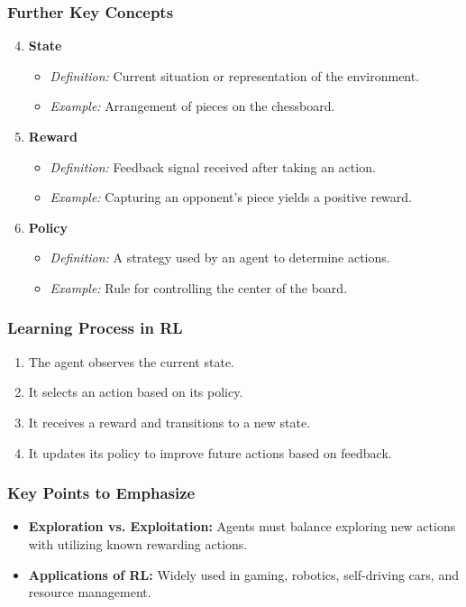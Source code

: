\documentclass[aspectratio=169]{beamer}
\begin{document}
\begin{frame}[fragile]
    \frametitle{Further Key Concepts}
    \begin{enumerate}
        \setcounter{enumi}{3}
        \item \textbf{State}
            \begin{itemize}
                \item \textit{Definition:} Current situation or representation of the environment.
                \item \textit{Example:} Arrangement of pieces on the chessboard.
            \end{itemize}
        
        \item \textbf{Reward}
            \begin{itemize}
                \item \textit{Definition:} Feedback signal received after taking an action.
                \item \textit{Example:} Capturing an opponent's piece yields a positive reward.
            \end{itemize}
        
        \item \textbf{Policy}
            \begin{itemize}
                \item \textit{Definition:} A strategy used by an agent to determine actions.
                \item \textit{Example:} Rule for controlling the center of the board.
            \end{itemize}
    \end{enumerate}
\end{frame}

\begin{frame}[fragile]
    \frametitle{Learning Process in RL}
    \begin{enumerate}
        \item The agent observes the current state.
        \item It selects an action based on its policy.
        \item It receives a reward and transitions to a new state.
        \item It updates its policy to improve future actions based on feedback.
    \end{enumerate}
\end{frame}

\begin{frame}[fragile]
    \frametitle{Key Points to Emphasize}
    \begin{itemize}
        \item \textbf{Exploration vs. Exploitation:} Agents must balance exploring new actions with utilizing known rewarding actions.
        \item \textbf{Applications of RL:} Widely used in gaming, robotics, self-driving cars, and resource management.
    \end{itemize}
\end{frame}
\end{document}
